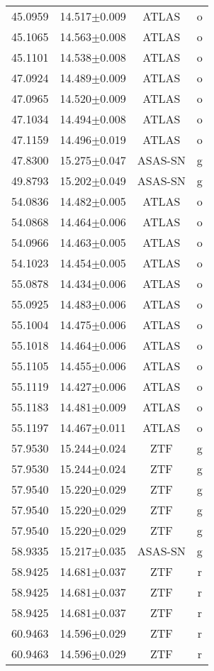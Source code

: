 \begin{table}
\begin{tabular}{cccc}
45.0959 & 14.517$\pm$0.009 & ATLAS & o \\
45.1065 & 14.563$\pm$0.008 & ATLAS & o \\
45.1101 & 14.538$\pm$0.008 & ATLAS & o \\
47.0924 & 14.489$\pm$0.009 & ATLAS & o \\
47.0965 & 14.520$\pm$0.009 & ATLAS & o \\
47.1034 & 14.494$\pm$0.008 & ATLAS & o \\
47.1159 & 14.496$\pm$0.019 & ATLAS & o \\
47.8300 & 15.275$\pm$0.047 & ASAS-SN & g \\
49.8793 & 15.202$\pm$0.049 & ASAS-SN & g \\
54.0836 & 14.482$\pm$0.005 & ATLAS & o \\
54.0868 & 14.464$\pm$0.006 & ATLAS & o \\
54.0966 & 14.463$\pm$0.005 & ATLAS & o \\
54.1023 & 14.454$\pm$0.005 & ATLAS & o \\
55.0878 & 14.434$\pm$0.006 & ATLAS & o \\
55.0925 & 14.483$\pm$0.006 & ATLAS & o \\
55.1004 & 14.475$\pm$0.006 & ATLAS & o \\
55.1018 & 14.464$\pm$0.006 & ATLAS & o \\
55.1105 & 14.455$\pm$0.006 & ATLAS & o \\
55.1119 & 14.427$\pm$0.006 & ATLAS & o \\
55.1183 & 14.481$\pm$0.009 & ATLAS & o \\
55.1197 & 14.467$\pm$0.011 & ATLAS & o \\
57.9530 & 15.244$\pm$0.024 & ZTF & g \\
57.9530 & 15.244$\pm$0.024 & ZTF & g \\
57.9540 & 15.220$\pm$0.029 & ZTF & g \\
57.9540 & 15.220$\pm$0.029 & ZTF & g \\
57.9540 & 15.220$\pm$0.029 & ZTF & g \\
58.9335 & 15.217$\pm$0.035 & ASAS-SN & g \\
58.9425 & 14.681$\pm$0.037 & ZTF & r \\
58.9425 & 14.681$\pm$0.037 & ZTF & r \\
58.9425 & 14.681$\pm$0.037 & ZTF & r \\
60.9463 & 14.596$\pm$0.029 & ZTF & r \\
60.9463 & 14.596$\pm$0.029 & ZTF & r \\

\end{tabular}
\end{table}
